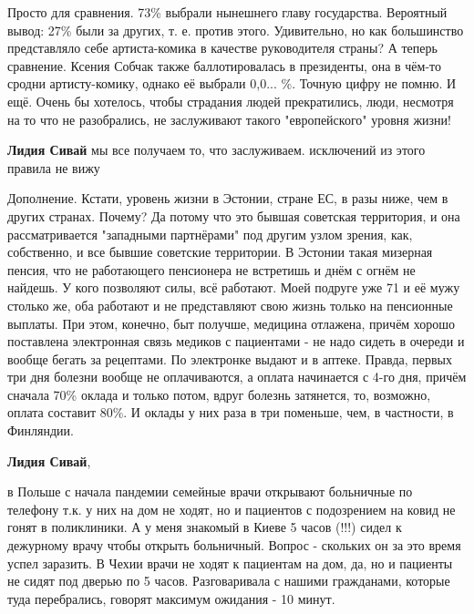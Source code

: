 \begin{itemize}
\begin{itemize}
\end{itemize} %


Просто для сравнения. 73\% выбрали нынешнего главу государства. Вероятный вывод:
27\% были за других, т. е. против этого. Удивительно, но как большинство
представляло себе артиста-комика в качестве руководителя страны? А теперь
сравнение. Ксения Собчак также баллотировалась в президенты, она в чём-то
сродни артисту-комику, однако её выбрали 0,0... \%. Точную цифру не помню. И
ещё. Очень бы хотелось, чтобы страдания людей прекратились, люди, несмотря на
то что не разобрались, не заслуживают такого "европейского" уровня жизни!

\begin{itemize} %
\textbf{Лидия Сивай} мы все получаем то, что заслуживаем. исключений из этого правила не вижу
\end{itemize} %


Дополнение. Кстати, уровень жизни в Эстонии, стране ЕС, в разы ниже, чем в
других странах. Почему? Да потому что это бывшая советская территория, и она
рассматривается "западными партнёрами" под другим узлом зрения, как,
собственно, и все бывшие советские территории. В Эстонии такая мизерная пенсия,
что не работающего пенсионера не встретишь и днём с огнём не найдешь. У кого
позволяют силы, всё работают. Моей подруге уже 71 и её мужу столько же, оба
работают и не представляют свою жизнь только на пенсионные выплаты. При этом,
конечно, быт получше, медицина отлажена, причём хорошо поставлена электронная
связь медиков с пациентами - не надо сидеть в очереди и вообще бегать за
рецептами. По электронке выдают и в аптеке. Правда, первых три дня болезни
вообще не оплачиваются, а оплата начинается с 4-го дня, причём сначала 70\%
оклада и только потом, вдруг болезнь затянется, то, возможно, оплата составит
80\%. И оклады у них раза в три поменьше, чем, в частности, в Финляндии.

\begin{itemize} %
\textbf{Лидия Сивай}, 

в Польше с начала пандемии семейные врачи открывают больничные по телефону т.к.
у них на дом не ходят, но и пациентов с подозрением на ковид не гонят в
поликлиники. А у меня знакомый в Киеве 5 часов (!!!) сидел к дежурному врачу
чтобы открыть больничный. Вопрос - скольких он за это время успел заразить. В
Чехии врачи не ходят к пациентам на дом, да, но и пациенты не сидят под дверью
по 5 часов. Разговаривала с нашими гражданами, которые туда перебрались,
говорят максимум ожидания - 10 минут.


\end{itemize}
\end{itemize}
